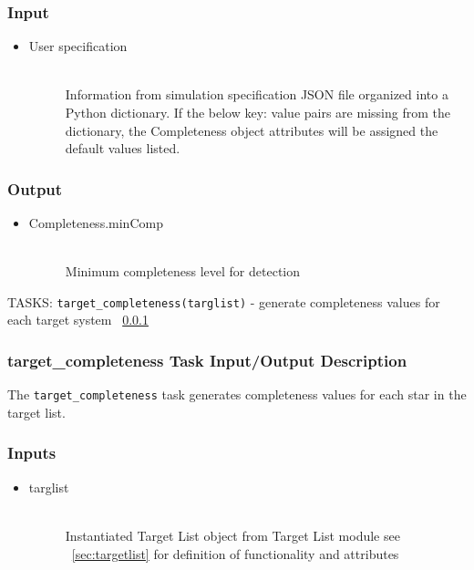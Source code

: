 \documentclass[cleanfoot]{asme2ej}
\begin{document}
\subsubsection*{Input}
\begin{itemize}
    \item 
    \begin{description}
        \item[User specification] \hfill \\
        Information from simulation specification JSON file organized into a Python dictionary. If the below key: value pairs are missing from the dictionary, the Completeness object attributes will be assigned the default values listed.
    \end{description}
\end{itemize}

\subsubsection*{Output}
\begin{itemize}
    \item 
    \begin{description}
        \item[Completeness.minComp] \hfill \\
        Minimum completeness level for detection
    \end{description}
\end{itemize}

TASKS: \verb+target_completeness(targlist)+ - generate completeness values for each target system ~\ref{sec:targetcompletenesstask}

\subsubsection{target\_completeness Task Input/Output Description}
\label{sec:targetcompletenesstask}
The \verb+target_completeness+ task generates completeness values for each star in the target list.

\subsubsection*{Inputs}
\begin{itemize}
    \item 
    \begin{description}
        \item[targlist] \hfill \\
        Instantiated Target List object from Target List module see ~\ref{sec:targetlist} for definition of functionality and attributes
    \end{description}
\end{itemize}
\end{document}
